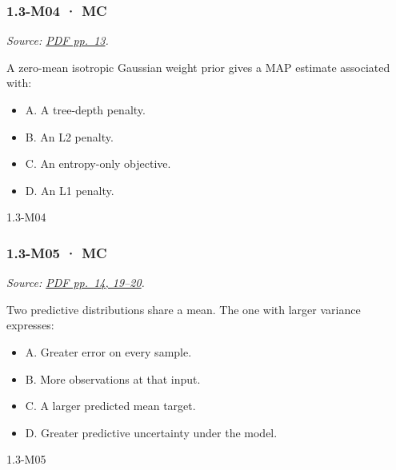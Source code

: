 \noindent\begin{minipage}{\linewidth}

\subsubsection{1.3-M04 · MC}\label{m04-mc-2}

\emph{Source:
\href{../Lecture\%20Slides/1.3.\%20Bayesian\%20Learning.pdf\#page=13}{PDF
pp.~13}.}

A zero-mean isotropic Gaussian weight prior gives a MAP estimate
associated with:

\begin{itemize}
\tightlist
\item
  A. A tree-depth penalty.
\item
  B. An L2 penalty.
\item
  C. An entropy-only objective.
\item
  D. An L1 penalty.
\end{itemize}

\begin{solution}[8mm]{1.3-M04}

\end{solution}
\end{minipage}\par\medskip

\noindent\begin{minipage}{\linewidth}

\subsubsection{1.3-M05 · MC}\label{m05-mc-2}

\emph{Source:
\href{../Lecture\%20Slides/1.3.\%20Bayesian\%20Learning.pdf\#page=14}{PDF
pp.~14, 19--20}.}

Two predictive distributions share a mean. The one with larger variance
expresses:

\begin{itemize}
\tightlist
\item
  A. Greater error on every sample.
\item
  B. More observations at that input.
\item
  C. A larger predicted mean target.
\item
  D. Greater predictive uncertainty under the model.
\end{itemize}

\begin{solution}[8mm]{1.3-M05}

\end{solution}
\end{minipage}\par\medskip


